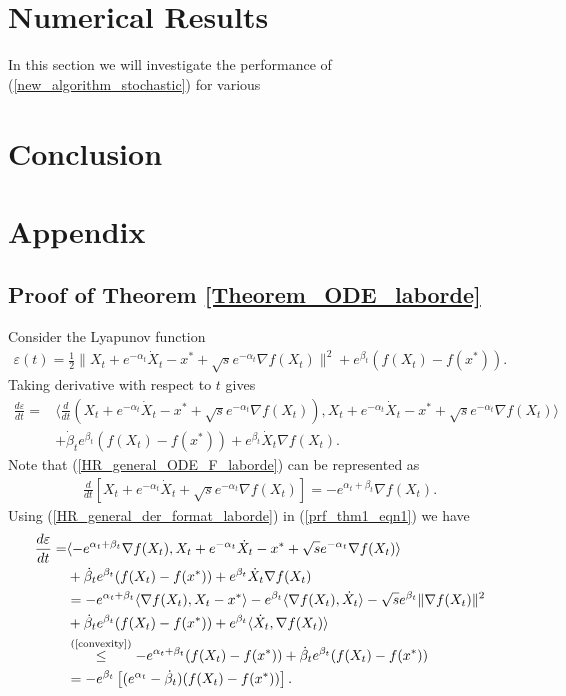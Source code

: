 \documentclass{article}
\theoremstyle{plain}
\theoremstyle{definition}
\theoremstyle{remark}
\begin{document}
\section{Numerical Results}\label{sec_numerical}
In this section we will investigate the performance of (\ref{new_algorithm_stochastic}) for various 
\section{Conclusion}\label{sec_conclusion}





\appendix
\section{Appendix}
\subsection{Proof of Theorem \ref{Theorem_ODE_laborde}}\label{thm1_proof}
Consider the Lyapunov function 
\begin{align}\label{lyap_theorem_C}
    \varepsilon(t)=\frac{1}{2}\|X_t+e^{-\alpha_t}\dot X_t-x^*+\sqrt{s}e^{-\alpha_t}\nabla f(X_t)\|^2+e^{\beta_t}(f(X_t)-f(x^*)).
\end{align}
Taking derivative with respect to $t$ gives
\begin{align}\label{prf_thm1_eqn1}
    \frac{d \varepsilon}{dt}=&\langle \frac{d}{dt}(X_t+e^{-\alpha_t}\dot X_t-x^*+\sqrt{s}e^{-\alpha_t}\nabla f(X_t)),X_t+e^{-\alpha_t}\dot X_t-x^*+\sqrt{s}e^{-\alpha_t}\nabla f(X_t)\rangle\nonumber\\
    & +\dot \beta_t e^{\beta_t}(f(X_t)-f(x^*))+e^{\beta_t}\dot X_t\nabla f(X_t).
\end{align}
Note that (\ref{HR_general_ODE_F_laborde}) can be represented as
\begin{align}\label{HR_general_der_format_laborde}
    \frac{d}{dt}\left[X_t+e^{-\alpha_t}\dot X_t+\sqrt{s}e^{-\alpha_t}\nabla f(X_t)\right]=-e^{\alpha_t+\beta_t}\nabla f(X_t).
\end{align}
Using (\ref{HR_general_der_format_laborde}) in (\ref{prf_thm1_eqn1}) we have
\begin{align}
     \frac{d \varepsilon}{dt}=& \langle -e^{\alpha_t+\beta_t}\nabla f(X_t),X_t+e^{-\alpha_t}\dot X_t-x^*+\sqrt{s}e^{-\alpha_t}\nabla f(X_t) \rangle \nonumber \\
     &+\dot \beta_t e^{\beta_t}(f(X_t)-f(x^*))+e^{\beta_t}\dot X_t\nabla f(X_t)\nonumber\\
     &= -e^{\alpha_t+\beta_t}\langle\nabla f(X_t),X_t-x^*\rangle -e^{\beta_t}\langle \nabla f(X_t),\dot X_t\rangle -\sqrt{s}e^{\beta_t}\|\nabla f(X_t)\|^2\nonumber\\
     &+\dot \beta_te^{\beta_t}(f(X_t)-f(x^*))+e^{\beta_t}\langle \dot X_t,\nabla f(X_t) \rangle\nonumber\\
     & \overset{\text{(\ref{convexity}})}{\leq} -e^{\alpha_t+\beta_t}(f(X_t)-f(x^*))+\dot \beta_te^{\beta_t}(f(X_t)-f(x^*))\nonumber\\
     & = -e^{\beta_t}\left[(e^{\alpha_t}-\dot \beta_t)(f(X_t)-f(x^*))\right].\nonumber
\end{align}
\end{document}
